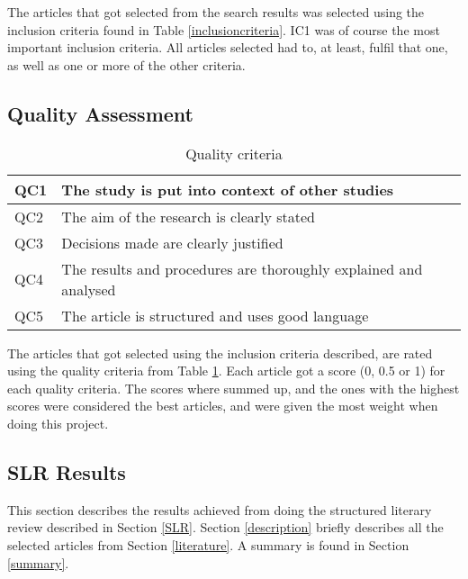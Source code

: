 The articles that got selected from the search results was selected using the inclusion criteria found in Table \ref{inclusioncriteria}. IC1 was of course the most important inclusion criteria. All articles selected had to, at least, fulfil that one, as well as one or more of the other criteria.


\subsection{Quality Assessment}

\begin{table}[h]
\centering
\begin{tabular}{|l|l|} \hline
QC1 & The study is put into context of other studies\\ \hline
QC2 & The aim of the research is clearly stated\\ \hline
QC3 & Decisions made are clearly justified\\ \hline
QC4 & The results and procedures are thoroughly explained and analysed \\ \hline
QC5 & The article is structured and uses good language \\ \hline
\end{tabular}
\caption{Quality criteria}
\label{qualitycriteria}
\end{table}

The articles that got selected using the inclusion criteria described, are rated using the quality criteria from Table \ref{qualitycriteria}. Each article got a score (0, 0.5 or 1) for each quality criteria. The scores where summed up, and the ones with the highest scores were considered the best articles, and were given the most weight when doing this project.


\subsection{SLR Results}

This section describes the results achieved from doing the structured literary review described in Section \ref{SLR}. Section \ref{description} briefly describes all the selected articles from Section \ref{literature}. A summary is found in Section \ref{summary}.

